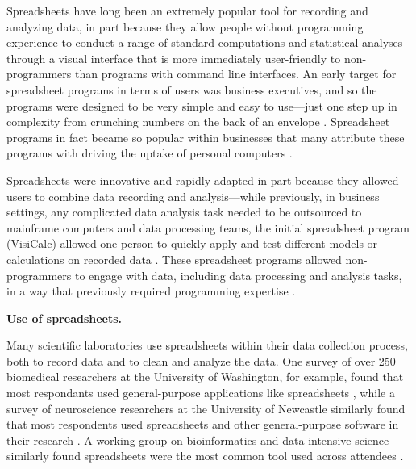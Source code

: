 \documentclass[]{tufte-book}
\begin{document}
Spreadsheets have long been an extremely popular tool for recording and
analyzing data, in part because they allow people without programming experience
to conduct a range of standard computations and statistical analyses through a
visual interface that is more immediately user-friendly to non-programmers than
programs with command line interfaces. An early target for spreadsheet programs
in terms of users was business executives, and so the programs were designed to
be very simple and easy to use---just one step up in complexity from crunching
numbers on the back of an envelope \citep{campbell2007number}. Spreadsheet programs
in fact became so popular within businesses that many attribute these programs
with driving the uptake of personal computers \citep{campbell2007number}.

Spreadsheets were innovative and rapidly adapted in part because they allowed
users to combine data recording and analysis---while previously, in business
settings, any complicated data analysis task needed to be outsourced to
mainframe computers and data processing teams, the initial spreadsheet program
(VisiCalc) allowed one person to quickly apply and test different models or
calculations on recorded data \citep{levy1984spreadsheet}. These spreadsheet programs
allowed non-programmers to engage with data, including data processing and
analysis tasks, in a way that previously required programming expertise
\citep{levy1984spreadsheet}.

\textbf{Use of spreadsheets.}

Many scientific laboratories use spreadsheets within their data collection
process, both to record data and to clean and analyze the data. One survey of
over 250 biomedical researchers at the University of Washington, for example,
found that most respondants used general-purpose applications like spreadsheets
\citep{anderson2007issues}, while a survey of neuroscience researchers at the
University of Newcastle similarly found that most respondents used spreadsheets
and other general-purpose software in their research \citep{altarawneh2017pilot}. A
working group on bioinformatics and data-intensive science similarly found
spreadsheets were the most common tool used across attendees
\citep{barga2011bioinformatics}.
\end{document}

